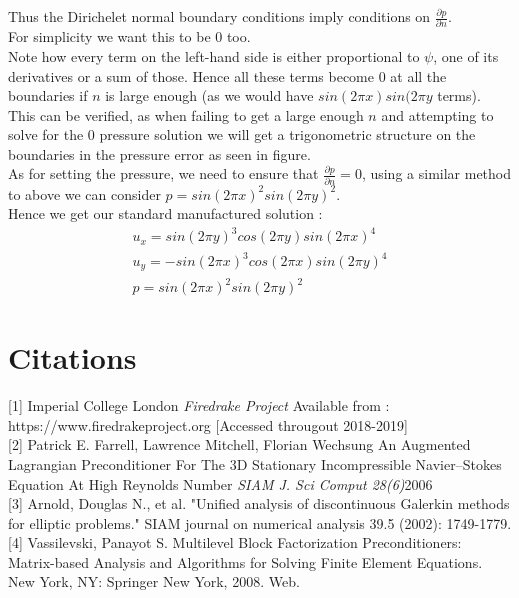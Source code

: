 \documentclass[11pt,twoside,a4paper]{article}
\begin{document}
Thus the Dirichelet normal boundary conditions imply conditions on $\frac{\partial p}{\partial n}$.\\
For simplicity we want this to be $0$ too.\\
Note how every term on the left-hand side is either proportional to $\psi$, one of its derivatives or a sum of those. Hence all these terms become $0$ at all the boundaries if $n$ is large enough (as we would have $ sin(2 \pi x) sin(2 \pi y$ terms).\\
This can be verified, as when failing to get a large enough $n$ and attempting to solve for the $0$ pressure solution we will get a trigonometric structure on the boundaries in the pressure error as seen in figure.\\
As for setting the pressure, we need to ensure that $\frac{\partial p} {\partial n} = 0$, using a similar method to above we can consider $p =  sin(2 \pi x)^2 sin(2 \pi y)^2$.\\
Hence we get our standard manufactured solution :
\begin{align}
u_x = sin(2 \pi y)^3 cos(2 \pi y)sin(2 \pi x)^4 \\
u_y= -sin(2 \pi x)^3 cos(2 \pi x) sin(2 \pi y)^4 \\
p = sin(2 \pi x)^2 sin(2 \pi y)^2
\end{align}
\section{Citations}

[1] Imperial College London \textit{Firedrake Project} Available from : https://www.firedrakeproject.org [Accessed througout 2018-2019]\\

[2] Patrick E. Farrell, Lawrence Mitchell, Florian Wechsung
 An Augmented Lagrangian Preconditioner For The 3D Stationary Incompressible Navier–Stokes Equation At High Reynolds Number
\textit{SIAM J. Sci Comput 28(6)}2006\\

[3] Arnold, Douglas N., et al. "Unified analysis of discontinuous Galerkin methods for elliptic problems." SIAM journal on numerical analysis 39.5 (2002): 1749-1779.\\

[4] Vassilevski, Panayot S. Multilevel Block Factorization Preconditioners: Matrix-based Analysis and Algorithms for Solving Finite Element Equations. New York, NY: Springer New York, 2008. Web.\\
\end{document}
